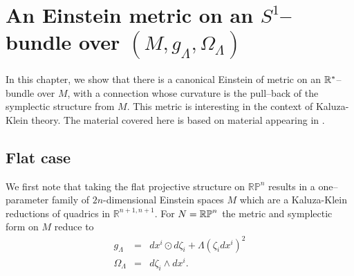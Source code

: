 
\chapter{An Einstein metric on an $S^1$--bundle over $(M,g_\Lambda,\Omega_\Lambda)$}
\label{chap:KK_lift}
In this chapter, we show that there is a canonical Einstein of metric on an $\mathbb{R}^*$--bundle over $M$, with a connection whose curvature is the pull--back
of the symplectic structure from $M$. This metric is interesting in the context of Kaluza-Klein theory. The material covered here is based on material appearing in \cite{DW}.


\section{Flat case} \label{sec:quadric}

We first note that taking the flat projective structure on $\mathbb{RP}^{n}$
results in a one--parameter family of $2n$-dimensional Einstein spaces $M$ which are a Kaluza-Klein
reductions of quadrics in $\mathbb{R}^{n+1,n+1}$. For $N=\mathbb{RP}^n$
the metric and symplectic form on $M$ reduce to 
\begin{eqnarray*}
g_{\Lambda} & = &  dx^{i} \odot d\zeta_{i}+\Lambda(\zeta_{i} dx^{i})^{2}\\
\Omega_{\Lambda} & = &  d\zeta_{i}\wedge dx^{i}.
\end{eqnarray*}

